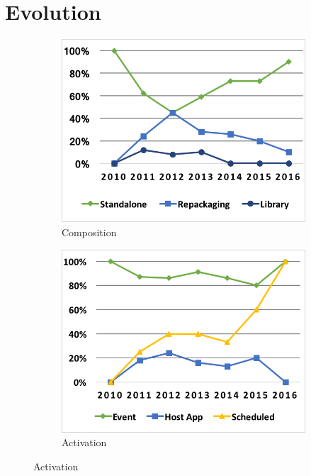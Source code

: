 \vspace{-.15in}
\section{Evolution}
\label{sec:evolution}
\vspace{-.1in}

\begin{figure}[t!]
\centering
\begin{subfigure}[b]{.32\textwidth}
  \centering
  \includegraphics[width=0.9\linewidth]{fig/charts/comp.png}
  \caption{Composition}
  \label{fig:sub:ins}
\end{subfigure}%
\begin{subfigure}[b]{.32\textwidth}
  \centering
  \includegraphics[width=0.9\linewidth]{fig/charts/act.png}
  \caption{Activation}
  \label{fig:sub:act}
\end{subfigure}%

\end{figure}
